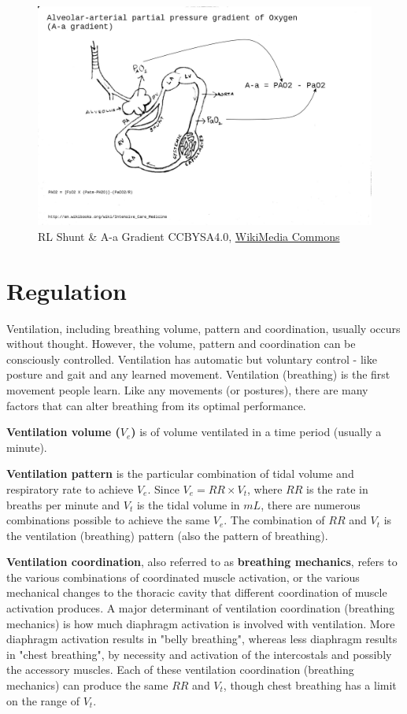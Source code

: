 \begin{figure}[!h]
    \centering
    \includegraphics[width=1.0 \linewidth]{./figure/ventilation/aagradient.jpg}
    \caption{RL Shunt \& A-a Gradient \footnotesize{CCBYSA4.0, \href{https://commons.wikimedia.org/wiki/File:Intensivecaremedicine_aagradient.jpg}{WikiMedia Commons}}}
    \label{fig:aagradient}
\end{figure}


\section{Regulation}

Ventilation, including breathing volume, pattern and coordination, usually occurs without thought. However, the volume, pattern and coordination can be consciously controlled. Ventilation has automatic but voluntary control - like posture and gait and any learned movement. Ventilation (breathing) is the first movement people learn. Like any movements (or postures), there are many factors that can alter breathing from its optimal performance.

\textbf{Ventilation volume ($V_e$)} is of volume ventilated in a time period (usually a minute). 

\textbf{Ventilation pattern} is the particular combination of tidal volume and respiratory rate to achieve $V_e$. Since $V_e = RR \times V_t$, where $RR$ is the rate in breaths per minute and $V_t$ is the tidal volume in $mL$, there are numerous combinations possible to achieve the same $V_e$. The combination of $RR$ and $V_t$ is the ventilation (breathing) pattern (also the pattern of breathing). 

\textbf{Ventilation coordination}, also referred to as \textbf{breathing mechanics}, refers to the various combinations of coordinated muscle activation, or the various mechanical changes to the thoracic cavity that different coordination of muscle activation produces. A major determinant of ventilation coordination (breathing mechanics) is how much diaphragm activation is involved with ventilation. More diaphragm activation results in "belly breathing", whereas less diaphragm results in "chest breathing", by necessity and activation of the intercostals and possibly the accessory muscles. Each of these ventilation coordination (breathing mechanics) can produce the same $RR$ and $V_t$, though chest breathing has a limit on the range of $V_t$.

